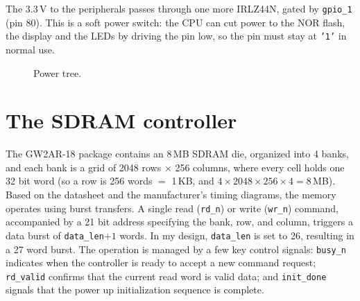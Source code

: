 \documentclass[a4paper,10pt]{article}
\begin{document}
The 3.3\,V to the peripherals passes through one more IRLZ44N, gated by \texttt{gpio\_1}
(pin 80). This is a soft power switch: the CPU can cut power to the NOR flash, the display
and the LEDs by driving the pin low, so the pin must stay at \texttt{'1'} in normal use.

\begin{figure}[H]
\centering
{}
\caption{Power tree.}
\label{fig:power}
\end{figure}

\section{The SDRAM controller}
\label{sec:sdram}

The GW2AR-18 package contains an 8\,MB SDRAM die, organized into 4 banks, and each bank
is a grid of 2048 rows $\times$ 256 columns, where every cell holds one 32 bit word
(so a row is 256 words $=$ 1\,KB, and $4\times2048\times256\times4 = 8$\,MB).
Based on the datasheet and the manufacturer's timing diagrams, 
the memory operates using burst transfers. A single read (\texttt{rd\_n})
 or write (\texttt{wr\_n}) command, accompanied by a 21 bit address specifying the bank,
 row, and column, triggers a data burst of \texttt{data\_len}$+1$ words.
 In my design, \texttt{data\_len} is set to 26, resulting in a 27 word burst.
The operation is managed by a few key control signals: \texttt{busy\_n} 
indicates when the controller is ready to accept a new command request;
 \texttt{rd\_valid} confirms that the current read word is valid data; 
 and \texttt{init\_done} signals that the power up initialization sequence is complete.
\end{document}
